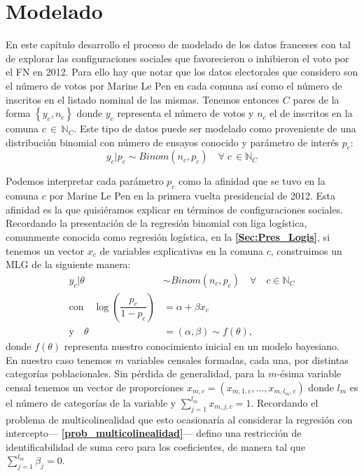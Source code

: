 \chapter{Modelado}

En este capítulo desarrollo el proceso de modelado de los datos franceses con tal de explorar las configuraciones sociales que favorecieron o inhibieron el voto por el FN en 2012. Para ello hay que notar que los datos electorales que considero son el número de votos por Marine Le Pen en cada comuna así como el número de inscritos en el listado nominal de las mismas. Tenemos entonces $C$ pares de la forma $\left\lbrace y_c, n_c \right\rbrace$ donde $y_c$ representa el número de votos y $n_c$ el de inscritos en la comuna $c \,\in\,\mathbb{N}_C$. Este tipo de datos puede ser modelado como proveniente de una distribución binomial con número de ensayos conocido y parámetro de interés $p_c$: 
\begin{equation*}
y_c|p_c \sim Binom(n_c, p_c) \quad \forall \; c \, \in \mathbb{N}_C
\end{equation*} 

Podemos interpretar cada parámetro $p_c$ como la afinidad que se tuvo en la comuna $c$ por Marine Le Pen en la primera vuelta presidencial de 2012. Esta afinidad es la que quisiéramos explicar en términos de configuraciones sociales.\\

Recordando la presentación de la regresión binomial con liga logística, comunmente conocida como regresión logística, en la \textbf{\autoref{Sec:Pres_Logis}}, si tenemos un vector $x_c$ de variables explicativas en la comuna $c$, construimos un MLG de la siguiente manera: 
\begin{align*}
y_c|\theta & \sim Binom(n_c,p_c) \quad \forall \quad c \in \mathbb{N}_C \\
\text{con} \quad \log\left(\dfrac{p_c}{1-p_c}\right) &= \alpha + \beta x_c \nonumber \\
\text{y} \quad \theta &= (\alpha,\beta) \sim f(\theta),
\end{align*}
donde $f(\theta)$ representa nuestro conocimiento inicial en un modelo bayesiano.\\ 

En nuestro caso tenemos $m$ variables censales formadas, cada una, por distintas categorías poblacionales. Sin pérdida de generalidad, para la $m$-ésima variable censal tenemos un vector de proporciones $x_{m,c}=(x_{m,1,c},\dots,x_{m,l_m,c})$ donde $l_m$ es el número de categorías de la variable y $\sum\limits_{j=1}^{l_m} x_{m,j,c}=1$. Recordando el problema de multicolinealidad que esto ocasionaría al considerar la regresión con intercepto--- \textbf{\autoref{prob_multicolinealidad}}--- defino una restricción de identificabilidad de suma cero para los coeficientes, de manera tal que $\sum\limits_{j=1}^{l_m}\beta_j=0$.\\

